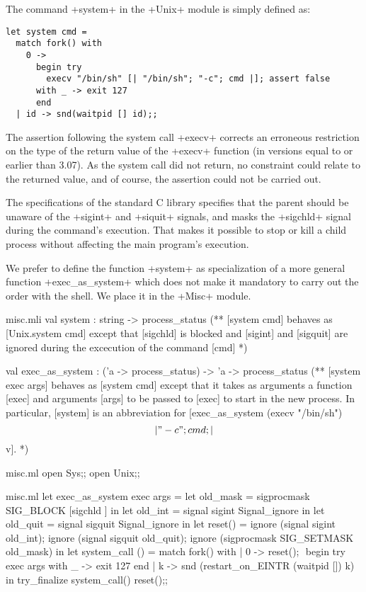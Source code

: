 \begin{example}
The command \ml+system+ in the \ml+Unix+ module is simply defined as: 

\begin{lstlisting}
let system cmd =
  match fork() with
    0 -> 
      begin try
        execv "/bin/sh" [| "/bin/sh"; "-c"; cmd |]; assert false
      with _ -> exit 127 
      end
  | id -> snd(waitpid [] id);;
\end{lstlisting}

The assertion following the system call \ml+execv+ corrects an
erroneous restriction on the type of the return value of the
\ml+execv+ function (in versions equal to or earlier than 3.07).
As the system call did not return, no constraint could relate to the
returned value, and of course, the assertion could not be
carried out.

The specifications of the standard C library specifies that the parent
should be unaware of the \ml+sigint+ and \ml+siquit+ signals, and masks
the \ml+sigchld+ signal during the command's execution.  
That makes it possible to stop or kill a child process without
affecting the main program's execution.

We prefer to define the function \ml+system+ as specialization of a
more general function \ml+exec_as_system+ which does not make it
mandatory to carry out the order with the shell. We place it in the
\ml+Misc+ module.

%
\begin{codefile}{misc.mli}
val system : string -> process_status
(** [system cmd] behaves as [Unix.system cmd] except that [sigchld] is
blocked and [sigint] and [sigquit] are ignored during the excecution 
of the command [cmd] *)

val exec_as_system : ('a -> process_status) -> 'a -> process_status
(** [system exec args] behaves as [system cmd] except that it takes as
arguments a function [exec] and arguments [args] to be passed to [exec]
to start in the new process. In particular, [system] is an abbreviation for 
[exec_as_system (execv "/bin/sh") \[|"-c"; cmd; |\] v]. *)
\end{codefile}
%
\begin{codefile}{misc.ml}
open Sys;;
open Unix;;
\end{codefile}
%
\begin{listingcodefile}[style=numbers]{misc.ml}
let exec_as_system exec args = 
  let old_mask = sigprocmask SIG_BLOCK [sigchld ] in 
  let old_int = signal sigint Signal_ignore in 
  let old_quit = signal sigquit Signal_ignore in 
  let reset() =
    ignore (signal sigint old_int); 
    ignore (signal sigquit old_quit);
    ignore (sigprocmask SIG_SETMASK old_mask) in
  let system_call () = 
    match fork() with
    | 0 -> 
        reset(); $\label{prog:sreset}$
        begin try 
          exec args 
        with _ -> exit 127 
        end
    | k -> 
        snd (restart_on_EINTR (waitpid []) k) in
  try_finalize system_call() reset();; $\label{prog:stry}$


\end{listingcodefile}
\end{example}
